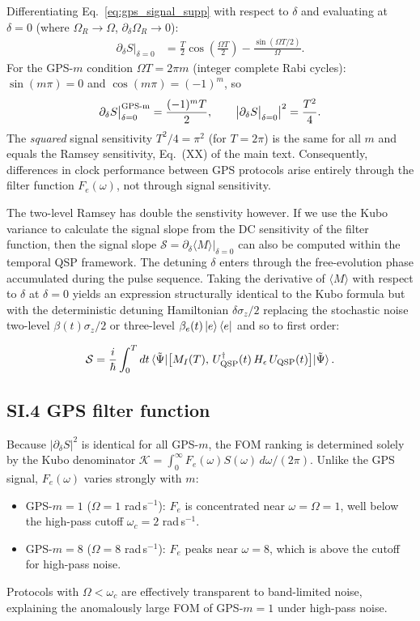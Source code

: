 \documentclass[aps,pra,twocolumn,superscriptaddress,longbibliography]{revtex4-2}
\newcommand{\be}{\begin{equation}}
\newcommand{\ee}{\end{equation}}
\begin{document}
Differentiating Eq.~\eqref{eq:gps_signal_supp} with respect to $\delta$ and
evaluating at $\delta=0$ (where $\Omega_R\to\Omega$, $\partial_\delta\Omega_R\to 0$):
\begin{align}
  \partial_\delta S\big|_{\delta=0}
  &= \frac{T}{2}\cos\!\left(\frac{\Omega T}{2}\right)
   - \frac{\sin(\Omega T/2)}{\Omega}.
   \label{eq:gps_deriv_supp}
\end{align}
For the GPS-$m$ condition $\Omega T = 2\pi m$ (integer complete Rabi cycles):
$\sin(m\pi) = 0$ and $\cos(m\pi) = (-1)^m$, so
\be
  \partial_\delta S\big|_{\delta=0}^{\rm GPS\text{-}m} = \frac{(-1)^m T}{2},
  \qquad
  \left|\partial_\delta S\big|_{\delta=0}\right|^2 = \frac{T^2}{4}.
  \label{eq:gps_sens_supp}
\ee
The \emph{squared} signal sensitivity $T^2/4 = \pi^2$ (for $T = 2\pi$) is the same for
all $m$ and equals the Ramsey sensitivity, Eq.~(XX) of the main text.
Consequently, differences in clock performance between GPS protocols arise entirely
through the filter function $F_e(\omega)$, not through signal sensitivity.

The two-level Ramsey has double the senstivity however. If we use the Kubo variance to calculate the signal slope from the DC sensitivity of the filter function, then the signal slope $\mathcal{S} = \partial_\delta\langle M\rangle|_{\delta=0}$ can also be computed within the temporal QSP framework.
The detuning $\delta$ enters through the free-evolution phase accumulated during the pulse sequence.
Taking the derivative of $\langle M\rangle$ with respect to $\delta$ at $\delta = 0$
yields an expression structurally identical to the Kubo formula but with the deterministic
detuning Hamiltonian $\delta\sigma_z/2$ replacing the stochastic noise two-level $\beta(t)\sigma_z/2$ or three-level $\beta_e(t) \ket{e}\bra{e}$ and so to first order:

\be
  \mathcal{S} = \frac{i}{\hbar}\int_0^T dt\,
     \langle \tilde\Psi | \bigl[M_I(T),\, U_{\rm QSP}^\dagger(t)\,H_{\epsilon}\,U_{\rm QSP}(t)\bigr] | \tilde\Psi \rangle\,.
  \label{eq:slope_tqsp}
\ee
\subsection*{SI.4 GPS filter function}

Because $|\partial_\delta S|^2$ is identical for all GPS-$m$, the FOM ranking is
determined solely by the Kubo denominator
$\mathcal{K} = \int_0^\infty F_e(\omega)S(\omega)\,d\omega/(2\pi)$.
Unlike the GPS signal, $F_e(\omega)$ varies strongly with $m$:
\begin{itemize}
  \item GPS-$m=1$ ($\Omega=1$ rad\,s$^{-1}$): $F_e$ is concentrated near $\omega=\Omega=1$,
        well below the high-pass cutoff $\omega_c = 2$ rad\,s$^{-1}$.
  \item GPS-$m=8$ ($\Omega=8$ rad\,s$^{-1}$): $F_e$ peaks near $\omega=8$,
        which is above the cutoff for high-pass noise.
\end{itemize}
Protocols with $\Omega < \omega_c$ are effectively transparent to band-limited noise,
explaining the anomalously large FOM of GPS-$m=1$ under high-pass noise.
\end{document}

